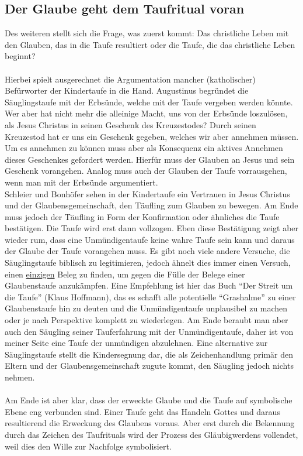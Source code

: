 \subsection{Der Glaube geht dem Taufritual voran}
Des weiteren stellt sich die Frage, was zuerst kommt: Das christliche Leben mit den Glauben, das in die Taufe resultiert oder die Taufe, die das christliche Leben beginnt? 
\\~\\
Hierbei spielt ausgerechnet die Argumentation mancher (katholischer) Befürworter der Kindertaufe in die Hand. Augustinus begründet die Säuglingstaufe mit der Erbsünde, welche mit der Taufe vergeben werden könnte.
Wer aber hat nicht mehr die alleinige Macht, uns von der Erbsünde loszulösen, als Jesus Christus in seinen Geschenk des Kreuzestodes?
Durch seinen Kreuzestod hat er uns ein Geschenk gegeben, welches wir aber annehmen müssen. Um es annehmen zu können muss aber als Konsequenz ein aktives Annehmen dieses Geschenkes gefordert werden. Hierfür muss der Glauben an Jesus und sein Geschenk vorangehen. Analog muss auch der Glauben der Taufe vorrausgehen, wenn man mit der Erbsünde argumentiert.
\\
Schleier und Bonhöfer sehen in der Kindertaufe ein Vertrauen in Jesus Christus und der Glaubensgemeinschaft, den Täufling zum
Glauben zu bewegen. Am Ende muss jedoch der Täufling in Form der Konfirmation oder ähnliches die Taufe bestätigen. Die Taufe wird erst dann vollzogen. Eben diese Bestätigung zeigt aber wieder rum, dass eine Unmündigentaufe keine wahre Taufe sein kann und daraus der Glaube der Taufe vorangehen muss. Es gibt noch viele andere Versuche, die Säuglingstaufe biblisch zu legitimieren, jedoch ähnelt dies immer einen Versuch, einen \underline{einzigen} Beleg zu finden, um gegen die Fülle der Belege einer Glaubenstaufe anzukämpfen. Eine Empfehlung ist hier das Buch ``Der Streit um die Taufe'' (Klaus Hoffmann), das es schafft alle potentielle ``Grashalme'' zu einer Glaubenstaufe hin zu deuten und die Unmündigentaufe unplausibel zu machen oder je nach Perspektive komplett zu wiederlegen. Am Ende beraubt man aber auch den Säugling seiner Tauferfahrung mit der Unmündigentaufe, daher ist von meiner Seite eine Taufe der unmündigen abzulehnen. Eine alternative zur Säuglingstaufe stellt die Kindersegnung dar, die als Zeichenhandlung primär den Eltern und der Glaubensgemeinschaft zugute kommt, den Säugling jedoch nichts nehmen.
\\~\\
Am Ende ist aber klar, dass der erweckte Glaube und die Taufe auf symbolische Ebene eng verbunden sind. Einer Taufe geht das Handeln Gottes und daraus resultierend die Erweckung des Glaubens voraus.
Aber erst durch die Bekennung durch das Zeichen des Taufrituals wird der Prozess des Gläubigwerdens vollendet, weil dies den Wille zur Nachfolge symbolisiert. 

